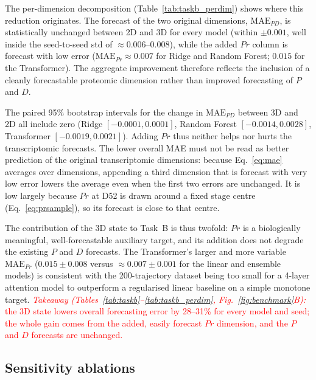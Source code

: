 \documentclass[5p,times,twocolumn]{elsarticle}
\newcommand{\rtag}[1]{}
\newcommand{\rev}[2]{\rtag{#1}\textcolor{red}{#2}}
\newenvironment{revblock}[1]{\par\color{red}\rtag{#1}\ignorespaces}{\par}
\begin{document}
The per-dimension decomposition (Table~\ref{tab:taskb_perdim})
shows where this reduction originates.
The forecast of the two original dimensions, $\text{MAE}_{PD}$,
is statistically unchanged between 2D and 3D for every model
(within $\pm 0.001$, well inside the seed-to-seed std of
$\approx 0.006$--$0.008$), while the added $Pr$ column is
forecast with low error ($\text{MAE}_{Pr} \approx 0.007$ for
Ridge and Random Forest; $0.015$ for the Transformer).
The aggregate improvement therefore reflects the inclusion of a
cleanly forecastable proteomic dimension rather than improved
forecasting of $P$ and $D$.
\begin{revblock}{R2.13,R1.9}
  The paired 95\% bootstrap intervals for the change in
  $\text{MAE}_{PD}$ between 3D and 2D all include zero (Ridge
  $[-0.0001, 0.0001]$, Random Forest $[-0.0014, 0.0028]$,
  Transformer $[-0.0019, 0.0021]$). Adding $Pr$ thus neither helps
  nor hurts the transcriptomic forecasts. The lower overall MAE
  must not be read as better prediction of the original
  transcriptomic dimensions: because Eq.~\eqref{eq:mae} averages
  over dimensions, appending a third dimension that is forecast
  with very low error lowers the average even when the first two
  errors are unchanged. It is low largely because $Pr$ at D52 is
  drawn around a fixed stage centre (Eq.~\eqref{eq:prsample}), so
  its forecast is close to that centre.
\end{revblock}
The contribution of the 3D state to Task~B is thus twofold:
$Pr$ is a biologically meaningful, well-forecastable auxiliary
target, and its addition does not degrade the existing $P$ and
$D$ forecasts.
The Transformer's larger and more variable $\text{MAE}_{Pr}$
($0.015 \pm 0.008$ versus $\approx 0.007 \pm 0.001$ for the
linear and ensemble models) is consistent with the
200-trajectory dataset being too small for a 4-layer attention
model to outperform a regularised linear baseline on a simple
monotone target.
\rev{R1.13}{\textit{Takeaway (Tables~\ref{tab:taskb}--\ref{tab:taskb_perdim},
    Fig.~\ref{fig:benchmark}B):} the 3D state lowers overall
  forecasting error by 28--31\% for every model and seed; the
  whole gain comes from the added, easily forecast $Pr$
  dimension, and the $P$ and $D$ forecasts are unchanged.}

\subsection{\textbf{Sensitivity ablations}}
\label{sec:res_ablations}
\end{document}
